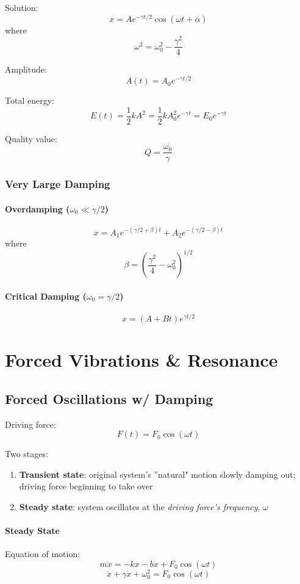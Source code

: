 \documentclass[11pt,letterpaper,titlepage,oneside]{book}
\begin{document}
Solution:
\[ x = A e^{-\gamma t/2} \cos(\omega t + \alpha) \]
where
\[ \omega ^2 = \omega_0^2 - \frac{\gamma^2}{4} \]

Amplitude:
\[ A(t) = A_0 e^{-\gamma t/2} \]

Total energy:
\[ E(t) = \frac{1}{2}kA^2 = \frac{1}{2}kA_0^2 e^{-\gamma t} = E_0 e^{-\gamma t} \]

Quality value:
\[ Q = \frac{\omega_0}{\gamma} \]

\subsection{Very Large Damping}
\subsubsection{Overdamping ($ \omega_0 \ll \gamma/2 $)}
\[ x = A_1 e^{-(\gamma/2 + \beta)t} + A_2 e^{-(\gamma/2-\beta)t} \]
where \[ \beta = \left(\frac{\gamma^2}{4}-\omega_0^2 \right)^{1/2} \]

\subsubsection{Critical Damping ($ \omega_0 = \gamma/2 $)}
\[ x = (A + Bt) e^{\gamma t/2}\]

\chapter{Forced Vibrations \& Resonance}
\section{Forced Oscillations w/ Damping}
Driving force:
\[ F(t) = F_0 \cos(\omega t) \]

Two stages:
\begin{enumerate}
\item \textbf{Transient state}: original system's ''natural" motion slowly damping out; driving force beginning to take over
\item \textbf{Steady state}: system oscillates at the \emph{driving force's frequency}, $\omega$
\end{enumerate}

\subsubsection{Steady State}

Equation of motion:
\[ m\ddot{x} = -kx - b\dot{x} + F_0 \cos(\omega t) \]
\[ \ddot{x} + \gamma\dot{x} + \omega_0^2 = F_0 \cos(\omega t) \]
\end{document}

